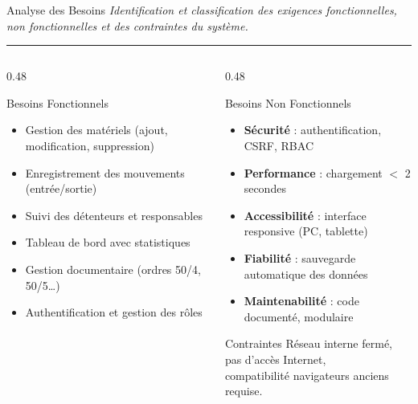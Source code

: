 \documentclass[
  aspectratio=169,       %
  xcolor=dvipsnames,     %
  t                      %
]{beamer}
\newcommand{\framedesc}[1]{%
  {\small\itshape\textcolor{PrimaryDark!80}{#1}}\par%
  \vspace{1pt}%
  {\color{PrimaryMid}\rule{\textwidth}{0.4pt}}%
  \vspace{4pt}%
}
\begin{document}
\begin{frame}{Analyse des Besoins}
  \framedesc{Identification et classification des exigences fonctionnelles, non fonctionnelles et des contraintes du système.}

  \begin{columns}[T]

    \begin{column}{0.48\textwidth}
      \begin{block}{Besoins Fonctionnels}
        \begin{itemize}
          \item Gestion des matériels (ajout, modification, suppression)
          \item Enregistrement des mouvements (entrée/sortie)
          \item Suivi des détenteurs et responsables
          \item Tableau de bord avec statistiques
          \item Gestion documentaire (ordres 50/4, 50/5…)
          \item Authentification et gestion des rôles
        \end{itemize}
      \end{block}
    \end{column}

    \begin{column}{0.48\textwidth}
      \begin{block}{Besoins Non Fonctionnels}
        \begin{itemize}
          \item \textbf{Sécurité} : authentification, CSRF, RBAC
          \item \textbf{Performance} : chargement $<$ 2 secondes
          \item \textbf{Accessibilité} : interface responsive (PC, tablette)
          \item \textbf{Fiabilité} : sauvegarde automatique des données
          \item \textbf{Maintenabilité} : code documenté, modulaire
        \end{itemize}
      \end{block}

      \vspace{0.2cm}

      \begin{alertblock}{Contraintes}
        Réseau interne fermé, pas d'accès Internet,\\
        compatibilité navigateurs anciens requise.
      \end{alertblock}

    \end{column}

  \end{columns}
\end{frame}
\end{document}
